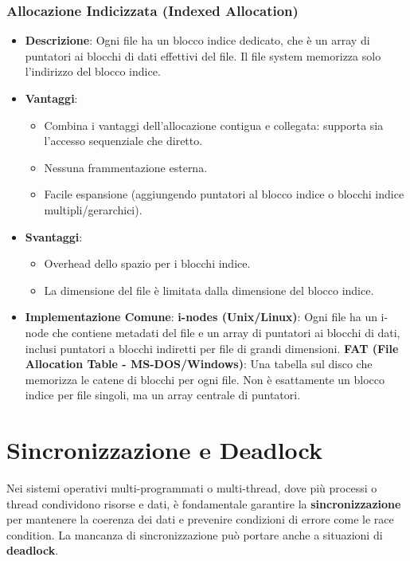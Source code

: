 \subsubsection{Allocazione Indicizzata (Indexed Allocation)}
\begin{itemize}
    \item \textbf{Descrizione}: Ogni file ha un blocco indice dedicato, che è un array di puntatori ai blocchi di dati effettivi del file. Il file system memorizza solo l'indirizzo del blocco indice.
    \item \textbf{Vantaggi}:
    \begin{itemize}
        \item Combina i vantaggi dell'allocazione contigua e collegata: supporta sia l'accesso sequenziale che diretto.
        \item Nessuna frammentazione esterna.
        \item Facile espansione (aggiungendo puntatori al blocco indice o blocchi indice multipli/gerarchici).
    \end{itemize}
    \item \textbf{Svantaggi}:
    \begin{itemize}
        \item Overhead dello spazio per i blocchi indice.
        \item La dimensione del file è limitata dalla dimensione del blocco indice.
    \end{itemize}
    \item \textbf{Implementazione Comune}: \textbf{i-nodes (Unix/Linux)}: Ogni file ha un i-node che contiene metadati del file e un array di puntatori ai blocchi di dati, inclusi puntatori a blocchi indiretti per file di grandi dimensioni.
\textbf{FAT (File Allocation Table - MS-DOS/Windows)}: Una tabella sul disco che memorizza le catene di blocchi per ogni file. Non è esattamente un blocco indice per file singoli, ma un array centrale di puntatori.
\end{itemize}

\section{Sincronizzazione e Deadlock}
Nei sistemi operativi multi-programmati o multi-thread, dove più processi o thread condividono risorse e dati, è fondamentale garantire la \textbf{sincronizzazione} per mantenere la coerenza dei dati e prevenire condizioni di errore come le race condition. La mancanza di sincronizzazione può portare anche a situazioni di \textbf{deadlock}.

